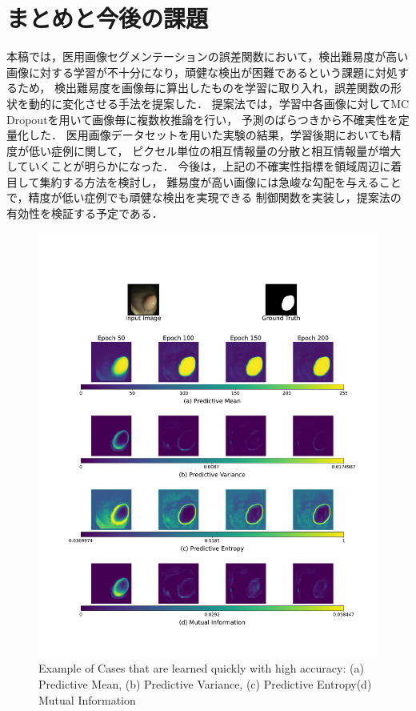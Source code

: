 \documentclass[10pt, a4paper, twocolumn]{jarticle}
\begin{document}
\section{まとめと今後の課題}
本稿では，医用画像セグメンテーションの誤差関数において，検出難易度が高い画像に対する学習が不十分になり，頑健な検出が困難であるという課題に対処するため，
検出難易度を画像毎に算出したものを学習に取り入れ，誤差関数の形状を動的に変化させる手法を提案した．
提案法では，学習中各画像に対してMC Dropoutを用いて画像毎に複数枚推論を行い，
予測のばらつきから不確実性を定量化した．
医用画像データセットを用いた実験の結果，学習後期においても精度が低い症例に関して，
ピクセル単位の相互情報量の分散と相互情報量が増大していくことが明らかになった．
今後は，上記の不確実性指標を領域周辺に着目して集約する方法を検討し，
難易度が高い画像には急峻な勾配を与えることで，精度が低い症例でも頑健な検出を実現できる
制御関数を実装し，提案法の有効性を検証する予定である．
\newpage

\begin{figure}[t] %
  \begin{center}
    \includegraphics[scale=0.25]{figure/fold5_file144_uncertainty_evolution.pdf}
    \caption{Example of Cases that are learned quickly with high accuracy:
    (a) Predictive Mean, (b) Predictive Variance,
    (c) Predictive Entropy(d) Mutual Information}
    \label{fold5_file144}
  \end{center}
\end{figure}
\end{document}
